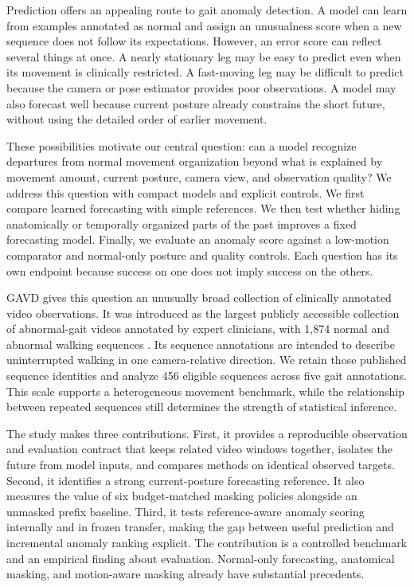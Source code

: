 \documentclass[letterpaper]{article}
\begin{document}
Prediction offers an appealing route to gait anomaly detection. A model can learn from examples annotated as normal and assign an unusualness score when a new sequence does not follow its expectations. However, an error score can reflect several things at once. A nearly stationary leg may be easy to predict even when its movement is clinically restricted. A fast-moving leg may be difficult to predict because the camera or pose estimator provides poor observations. A model may also forecast well because current posture already constrains the short future, without using the detailed order of earlier movement.

These possibilities motivate our central question: can a model recognize departures from normal movement organization beyond what is explained by movement amount, current posture, camera view, and observation quality? We address this question with compact models and explicit controls. We first compare learned forecasting with simple references. We then test whether hiding anatomically or temporally organized parts of the past improves a fixed forecasting model. Finally, we evaluate an anomaly score against a low-motion comparator and normal-only posture and quality controls. Each question has its own endpoint because success on one does not imply success on the others.

GAVD gives this question an unusually broad collection of clinically annotated video observations. It was introduced as the largest publicly accessible collection of abnormal-gait videos annotated by expert clinicians, with 1,874 normal and abnormal walking sequences \citep{ranjan2025}. Its sequence annotations are intended to describe uninterrupted walking in one camera-relative direction. We retain those published sequence identities and analyze 456 eligible sequences across five gait annotations. This scale supports a heterogeneous movement benchmark, while the relationship between repeated sequences still determines the strength of statistical inference.

The study makes three contributions. First, it provides a reproducible observation and evaluation contract that keeps related video windows together, isolates the future from model inputs, and compares methods on identical observed targets. Second, it identifies a strong current-posture forecasting reference. It also measures the value of six budget-matched masking policies alongside an unmasked prefix baseline. Third, it tests reference-aware anomaly scoring internally and in frozen transfer, making the gap between useful prediction and incremental anomaly ranking explicit. The contribution is a controlled benchmark and an empirical finding about evaluation. Normal-only forecasting, anatomical masking, and motion-aware masking already have substantial precedents.
\end{document}
